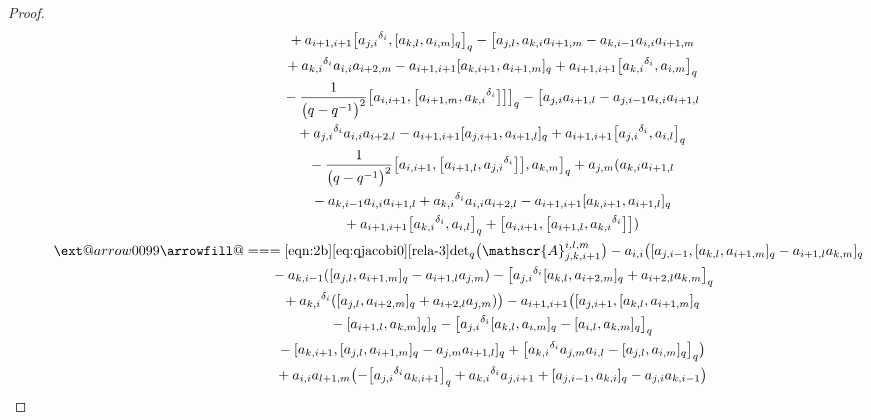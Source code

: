 \documentclass[10pt,a4paper]{amsart}
\makeatletter
\def\x@arrow{\DOTSB\Relbar}
\def\xlongequalsignfill@{\arrowfill@\x@arrow\Relbar\x@arrow}
\providecommand{\xlongequal}[2][]{%
	\ext@arrow 0099\xlongequalsignfill@{#1}{#2}}
\numberwithin{equation}{section}
\def\d{\delta}
\def\A{\mathscr{A}}
\makeatother
\begin{document}
\begin{proof}
\begin{gather*}
 \quad\qquad\qquad\qquad\ \ {}+ a_{i+1,i+1} \bigl[{a_{j,i}}^{\d_i}, [a_{k,l},a_{i,m} ]_q \bigr]_q- \bigl[a_{j,l},a_{k,i}a_{i+1,m}-a_{k,i-1}a_{i,i}a_{i+1,m} \\
 \quad\qquad\qquad\qquad\ \ {}+ {a_{k,i}}^{\d_i}a_{i,i}a_{i+2,m} -a_{i+1,i+1} [a_{k,i+1},a_{i+1,m} ]_q + a_{i+1,i+1} \bigl[{a_{k,i}}^{\d_i},a_{i,m} \bigr]_q \\
\quad\qquad\qquad \qquad\ \ {}-\frac{1}{\bigl(q-q^{-1}\bigr)^2} \bigl[a_{i,i+1}, \bigl[a_{i+1,m}, {a_{k,i}}^{\d_i} \bigr] \bigr] \bigr]_q - \bigl[a_{j,i}a_{i+1,l} -a_{j,i-1}a_{i,i}a_{i+1,l} \\
 \quad\qquad\qquad\qquad\ \ {}+{a_{j,i}}^{\d_i}a_{i,i}a_{i+2,l} -a_{i+1,i+1} [a_{j,i+1},a_{i+1,l} ]_q +a_{i+1,i+1} \bigl[{a_{j,i}}^{\d_i},a_{i,l} \bigr]_q \\
\quad\qquad\qquad \qquad\ \ {}-\frac{1}{\bigl(q-q^{-1}\bigr)^2} \bigl[a_{i,i+1}, \bigl[a_{i+1,l},{a_{j,i}}^{\d_i} \bigr] \bigr],a_{k,m} \bigr]_q +a_{j,m} (a_{k,i}a_{i+1,l} \\
 \quad\qquad\qquad\qquad\ \ {}-a_{k,i-1}a_{i,i}a_{i+1,l}+{a_{k,i}}^{\d_i}a_{i,i}a_{i+2,l} -a_{i+1,i+1} [a_{k,i+1},a_{i+1,l} ]_q\\
\quad\qquad\qquad\qquad\ \ {}+a_{i+1,i+1} \bigl[{a_{k,i}}^{\d_i},a_{i,l} \bigr]_q +\bigl[a_{i,i+1}, \bigl[a_{i+1,l},{a_{k,i}}^{\d_i} \bigr] \bigr] )\\
\quad\qquad \xlongequal[\eqref{eqn:2b}\eqref{eq:qjacobi0}]{\eqref{rela-3}} {\det}_q\bigl(\A_{j,k,i+1}^{i,l,m}\bigr)-a_{i,i} \bigl( [a_{j,i-1}, [a_{k,l}, a_{i+1,m} ]_q -a_{i+1,l}a_{k,m} ]_q \\
 \quad\qquad\qquad\qquad\ \ {}-a_{k,i-1} ( [a_{j,l},a_{i+1,m} ]_q- a_{i+1,l}a_{j,m} )- \bigl[{a_{j,i}}^{\d_i} [a_{k,l},a_{i+2,m} ]_q +a_{i+2,l}a_{k,m} \bigr]_q\!\\
 \quad\qquad\qquad\qquad\ \ {}+{a_{k,i}}^{\d_i} ( [a_{j,l},a_{i+2,m} ]_q + a_{i+2,l}a_{j,m} ) \bigr)-a_{i+1,i+1} \bigl( [a_{j,i+1}, [a_{k,l},a_{i+1,m} ]_q\\
 \quad\qquad\qquad\qquad\ \ {}- [a_{i+1,l}, a_{k,m} ]_q ]_q- \bigl[{a_{j,i}}^{\d_i} [a_{k,l},a_{i,m} ]_q - [a_{i,l},a_{k,m} ]_q \bigr]_q
\\
 \quad\qquad\qquad\qquad\ \ {}- [a_{k,i+1}, [a_{j,l},a_{i+1,m} ]_q-a_{j,m}a_{i+1,l} ]_q + \bigl[{a_{k,i}}^{\d_i}a_{j,m}a_{i,l} - [a_{j,l},a_{i,m} ]_q \bigr]_q \bigr)\\
 \quad\qquad\qquad\qquad\ \ {}+a_{i,i}a_{l+1,m} \bigl(- \bigl[{a_{j,i}}^{\d_i}a_{k,i+1} \bigr]_q+{a_{k,i}}^{\d_i}a_{j,i+1} + [a_{j,i-1},a_{k,i} ]_q-a_{j,i}a_{k,i-1} \bigr)\\

\end{gather*}
\end{proof}
\end{document}
